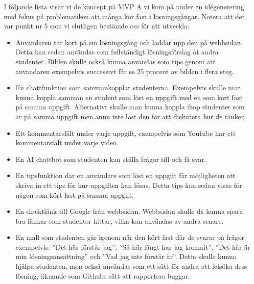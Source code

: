 I följande lista visar vi de koncept på MVP A vi kom på under en idégenerering med fokus på problematiken att många kör fast i lösningsgångar. Notera att det var punkt nr 5 som vi slutligen bestämde oss för att utveckla:
\begin{itemize}
    \item Användaren tar kort på sin lösningsgång och laddar upp den på webbsidan. Detta kan sedan användas som fullständigt lösningsförslag åt andra studenter. Bilden  skulle också kunna användas som tips genom att användaren exempelvis successivt får se 25 procent av bilden i flera steg. 
    \item En chattfunktion som sammankopplar studenterna. Exempelvis skulle man kunna koppla samman en student som löst en uppgift med en som kört fast på samma uppgift. Alternativt skulle man kunna koppla ihop studenter som är på samma uppgift men ännu inte löst den för att diskutera hur de tänker.  
    \item Ett kommentarsfält under varje uppgift, exempelvis som Youtube har ett kommentarsfält under varje video.   
    \item En AI chattbot som studenten kan ställa frågor till och få svar. 
    \item En tipsfunktion där en användare som löst en uppgift får möjligheten att skriva in ett tips för hur uppgiften kan lösas. Detta tips kan sedan visas för någon som kört fast på samma uppgift.
    \item En direktlänk till Google från webbsidan. Webbsidan skulle då kunna spara bra länkar som studenter hittar, vilka kan användas av andra senare.  
    \item En mall som studenten går igenom när den kört fast där de svarar på frågor exempelvis: ''Det här förstår jag'', ''Så här långt har jag kommit'', ''Det här är min lösningsansättning'' och ''Vad jag inte förstår är''. Detta skulle kunna hjälpa studenten, men också användas som ett sätt för andra att felsöka dess lösning, liknande som Githubs sätt att rapportera buggar.  
\end{itemize}
